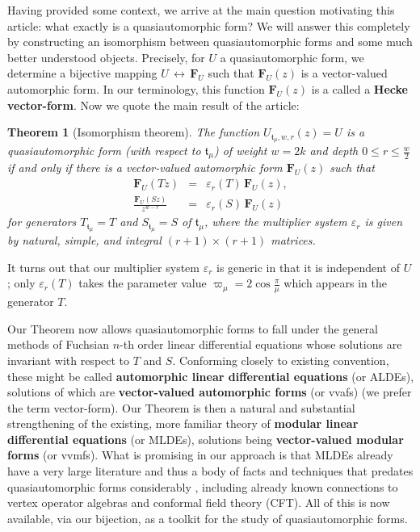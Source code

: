 \documentclass[11pt]{article}
\newtheorem{thm}{Theorem}
\begin{document}
Having provided some context, we arrive at the main question motivating this article: what exactly is a quasiautomorphic form? We will answer this completely by constructing an isomorphism between quasiautomorphic forms and some much better understood objects. Precisely, for $ U $ a quasiautomorphic form, we determine a bijective mapping $ U\, \leftrightarrow\, \mathbf{F}_U$ such that $ \mathbf{F}_U(z) $ is a vector-valued automorphic form. In our terminology, this function $\mathbf{F}_U(z) $ is a called a \textbf{Hecke vector-form}. Now we quote the main result of the article:
    \begin{thm}[Isomorphism theorem]
        The function $ U_{\mathfrak{t}_\mu, w, r}(z) = U $ is a quasiautomorphic form (with respect to $ \mathfrak{t}_\mu $) of weight $ w = 2k $ and depth $ 0 \leq r \leq \frac{w}{2}  $ if and only if there is a vector-valued automorphic form $ \mathbf{F}_U(z) $ such that
            \begin{eqnarray*}
                    \mathbf{F}_U(Tz) &=& \varepsilon_{r}(T)\,\mathbf{F}_U(z), \\
                    \frac{\mathbf{F}_U(Sz)}{z^{w-r}} &=& \varepsilon_r(S)\, \mathbf{F}_U(z)  
            \end{eqnarray*}
        for generators $ T_{\mathfrak{t}_\mu} = T $ and $  S_{\mathfrak{t}_\mu } =  S $ of $ \mathfrak{t}_\mu $, where the multiplier system $\varepsilon_r $ is given by natural, simple, and integral $ (r+1) \times (r+1) $ matrices.
    \end{thm}
It turns out that our multiplier system $ \varepsilon_r $ is generic in that it is independent of $ U $; only $ \varepsilon_r(T) $ takes the parameter value $ \varpi_\mu = 2 \cos \frac{\pi}{\mu} $ which appears in the generator $ T $.    

Our Theorem now allows quasiautomorphic forms to fall under the general methods of Fuchsian $n$-th order linear differential equations whose solutions are invariant with respect to $ T $ and $ S $. Conforming closely to existing convention, these might be called \textbf{automorphic linear differential equations} (or ALDEs), solutions of which are \textbf{vector-valued automorphic forms} (or vvafs) (we prefer the term vector-form). Our Theorem is then a natural and substantial strengthening of the existing, more familiar theory of \textbf{modular linear differential equations} (or MLDEs), solutions being \textbf{vector-valued modular forms} (or vvmfs). What is promising in our approach is that MLDEs already have a very large literature and thus a body of facts and techniques that predates quasiautomorphic forms considerably \cite{francMason2016}, including already known connections to vertex operator algebras and conformal field theory (CFT). All of this is now available, via our bijection, as a toolkit for the study of quasiautomorphic forms.
\end{document}
